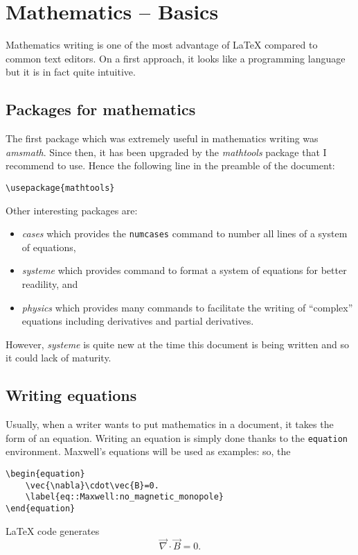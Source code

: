 

\chapter{Mathematics -- Basics}

	\label{cha::maths:basics}


Mathematics writing is one of the most advantage of \LaTeX{} compared to common text editors.
On a first approach, it looks like a programming language but it is in fact quite intuitive.



\section{Packages for mathematics}


	The first package which was extremely useful in mathematics writing was \emph{amsmath}.
	Since then, it has been upgraded by the \emph{mathtools} package that I recommend to use.
	Hence the following line in the preamble of the document:
\begin{lstlisting}[language={[LaTeX]TeX}]
\usepackage{mathtools}
\end{lstlisting}


	Other interesting packages are:
	\begin{itemize}
		\item \emph{cases} which provides the \texttt{numcases} command to number all lines of a system of equations,
		\item \emph{systeme} which provides command to format a system of equations for better readility, and
		\item \emph{physics} which provides many commands to facilitate the writing of \enquote{complex} equations including derivatives and partial derivatives.
	\end{itemize}
	However, \emph{systeme} is quite new at the time this document is being written and so it could lack of maturity.



\section{Writing equations}


	Usually, when a writer wants to put mathematics in a document, it takes the form of an equation.
	Writing an equation is simply done thanks to the \texttt{equation} environment.
	Maxwell's equations will be used as examples: so, the 
\begin{lstlisting}[language={[LaTeX]TeX}]
\begin{equation}
	\vec{\nabla}\cdot\vec{B}=0.
	\label{eq::Maxwell:no_magnetic_monopole}
\end{equation}
\end{lstlisting}
	\LaTeX{} code generates
	\begin{equation}
		\vec{\nabla}\cdot\vec{B}=0.
		\label{eq::Maxwell:no_magnetic_monopole}
	\end{equation}
	
